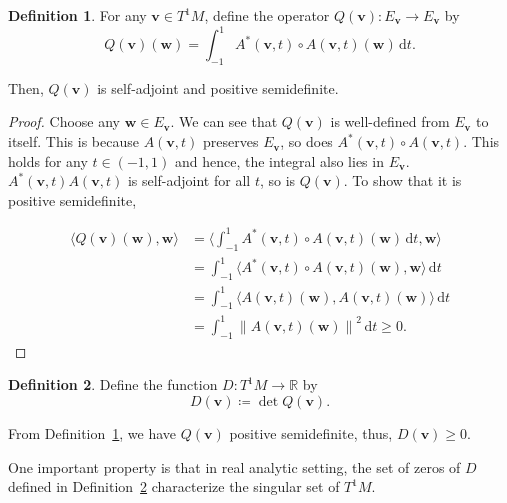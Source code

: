 \documentclass[reqno,11pt]{article}
\theoremstyle{definition}
\newtheorem{definition}{Definition}[section]
\theoremstyle{remark}
\numberwithin{equation}{section}
\begin{document}
\begin{definition}\label{def_6_2}
	For any $\bm{v}\in T^{1}M$, define the operator $Q(\bm{v}):E_{\bm{v}}\to E_{\bm{v}}$ by
	\begin{displaymath}
		Q(\bm{v})(\bm{w})=\int_{-1}^{1} A^{\ast}(\bm{v},t)\circ A(\bm{v},t)(\bm{w})\,\mathrm{d}t.
	\end{displaymath}

	Then, $Q(\bm{v})$ is self-adjoint and positive semidefinite.
\end{definition}

\begin{proof}
	Choose any $\bm{w}\in E_{\bm{v}}$. We can see that $Q(\bm{v})$ is well-defined from $E_{\bm{v}}$ to itself. This is because $A(\bm{v},t)$ preserves $E_{\bm{v}}$, so does $A^{\ast}(\bm{v},t)\circ A(\bm{v},t)$. This holds for any $t\in (-1,1)$ and hence, the integral also lies in $E_{\bm{v}}$. $A^{\ast}(\bm{v},t)A(\bm{v},t)$ is self-adjoint for all $t$, so is $Q(\bm{v})$. To show that it is positive semidefinite,

	\begin{displaymath}
		\begin{aligned}
			\langle Q(\bm{v})(\bm{w}),\bm{w}\rangle & =\langle \int_{-1}^{1} A^{\ast}(\bm{v},t)\circ A(\bm{v},t)(\bm{w})\,\mathrm{d}t,\bm{w}\rangle \\
			                                        & =\int_{-1}^{1}\langle A^{\ast}(\bm{v},t)\circ A(\bm{v},t)(\bm{w}),\bm{w}\rangle\,\mathrm{d}t  \\
			                                        & =\int_{-1}^{1}\langle A(\bm{v},t)(\bm{w}),A(\bm{v},t)(\bm{w})\rangle\,\mathrm{d}t             \\
			                                        & =\int_{-1}^{1}{\lVert A(\bm{v},t)(\bm{w})\rVert}^2\,\mathrm{d}t\geq 0.
		\end{aligned}
	\end{displaymath}
\end{proof}

\begin{definition}\label{def_6_3}
	Define the function $D:T^{1}M\to\mathbb{R}$ by
	\begin{equation}
		D(\bm{v})\coloneq \det Q(\bm{v}).
	\end{equation}

	From Definition~\ref{def_6_2}, we have $Q(\bm{v})$ positive semidefinite, thus, $D(\bm{v})\ge 0$.
\end{definition}

One important property is that in real analytic setting, the set of zeros of $D$ defined in Definition~\ref{def_6_3} characterize the singular set of $T^{1}M$.
\end{document}
